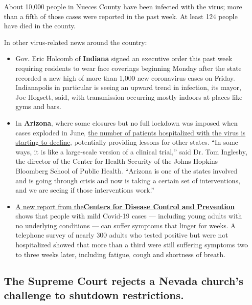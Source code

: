 About 10,000 people in Nueces County have been infected with the virus;
more than a fifth of those cases were reported in the past week. At
least 124 people have died in the county.

In other virus-related news around the country:

\begin{itemize}
\item
  Gov. Eric Holcomb of \textbf{Indiana} signed an executive order this
  past week requiring residents to wear face coverings beginning Monday
  after the state recorded a new high of more than 1,000 new coronavirus
  cases on Friday. Indianapolis in particular is seeing an upward trend
  in infection, its mayor, Joe Hogsett, said, with transmission
  occurring mostly indoors at places like gyms and bars.
\item
  In \textbf{Arizona}, where some closures but no full lockdown was
  imposed when cases exploded in June,
  \href{https://www.nytimes3xbfgragh.onion/2020/07/24/us/coronavirus-arizona.html}{the
  number of patients hospitalized with the virus is starting to
  decline}, potentially providing lessons for other states. ``In some
  ways, it is like a large-scale version of a clinical trial,'' said Dr.
  Tom Inglesby, the director of the Center for Health Security of the
  Johns Hopkins Bloomberg School of Public Health. ``Arizona is one of
  the states involved and is going through crisis and now is taking a
  certain set of interventions, and we are seeing if those interventions
  work.''
\end{itemize}

\begin{itemize}
\tightlist
\item
  \href{https://www.cdc.gov/mmwr/volumes/69/wr/mm6930e1.htm?s_cid=mm6930e1_w}{A
  new report from
  the}\textbf{\href{https://www.cdc.gov/mmwr/volumes/69/wr/mm6930e1.htm?s_cid=mm6930e1_w}{Centers
  for Disease Control and Prevention}} shows that people with mild
  Covid-19 cases --- including young adults with no underlying
  conditions --- can suffer symptoms that linger for weeks. A telephone
  survey of nearly 300 adults who tested positive but were not
  hospitalized showed that more than a third were still suffering
  symptoms two to three weeks later, including fatigue, cough and
  shortness of breath.
\end{itemize}

\hypertarget{the-supreme-court-rejects-a-nevada-churchs-challenge-to-shutdown-restrictions}{%
\subsection{The Supreme Court rejects a Nevada church's challenge to
shutdown
restrictions.}\label{the-supreme-court-rejects-a-nevada-churchs-challenge-to-shutdown-restrictions}}


